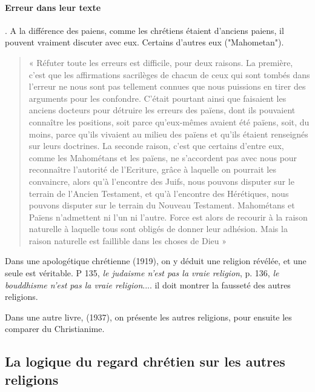 \paragraph{Erreur dans leur texte}. A la différence des paiens, comme les chrétiens étaient d'anciens paiens, il pouvent vraiment discuter avec eux. 
Certains d'autres eux ("Mahometan"). 
\begin{quote}
    « Réfuter toute les erreurs est difficile, pour deux raisons. La première, c’est que les affirmations
sacrilèges de chacun de ceux qui sont tombés dans l’erreur ne nous sont pas tellement connues que
nous puissions en tirer des arguments pour les confondre. C’était pourtant ainsi que faisaient les
anciens docteurs pour détruire les erreurs des païens, dont ils pouvaient connaître les positions, soit
parce qu’eux-mêmes avaient été païens, soit, du moins, parce qu’ils vivaient au milieu des païens et
qu’ils étaient renseignés sur leurs doctrines. La seconde raison, c’est que certains d’entre eux,
comme les Mahométans et les païens, ne s’accordent pas avec nous pour reconnaître l’autorité de
l’Ecriture, grâce à laquelle on pourrait les convaincre, alors qu’à l’encontre des Juifs, nous pouvons
disputer sur le terrain de l’Ancien Testament, et qu’à l’encontre des Hérétiques, nous pouvons
disputer sur le terrain du Nouveau Testament. Mahométans et Païens n’admettent ni l’un ni l’autre.
Force est alors de recourir à la raison naturelle à laquelle tous sont obligés de donner leur adhésion.
Mais la raison naturelle est faillible dans les choses de Dieu » 
\end{quote}



Dans une apologétique chrétienne (1919), on y déduit une religion révélée, et une seule est véritable. P 135, \textit{le judaisme n'est pas la vraie religion}, p. 136, \textit{le bouddhisme n'est pas la vraie religion}.... il doit montrer la fausseté des autres religions.



Dans une autre livre, (1937), on présente les autres religions, pour ensuite les comparer du Christianime. 

\subsection{La logique du regard chrétien sur les autres religions}



